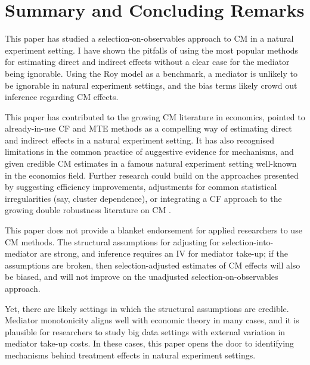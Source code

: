 \section{Summary and Concluding Remarks}
\label{sec:conclusion}

This paper has studied a selection-on-observables approach to CM in a natural experiment setting.
I have shown the pitfalls of using the most popular methods for estimating direct and indirect effects without a clear case for the mediator being ignorable.
Using the Roy model as a benchmark, a mediator is unlikely to be ignorable in natural experiment settings, and the bias terms likely crowd out inference regarding CM effects.

This paper has contributed to the growing CM literature in economics, pointed to already-in-use CF and MTE methods as a compelling way of estimating direct and indirect effects in a natural experiment setting.
It has also recognised limitations in the common practice of auggestive evidence for mechanisms, and given credible CM estimates in a famous natural experiment setting well-known in the economics field.
Further research could build on the approaches presented by suggesting efficiency improvements, adjustments for common statistical irregularities (say, cluster dependence), or integrating a CF approach to the growing double robustness literature on CM \citep{farbmacher2022causal,bia2024double}.

This paper does not provide a blanket endorsement for applied researchers to use CM methods.
The structural assumptions for adjusting for selection-into-mediator are strong, and inference requires an IV for mediator take-up; if the assumptions are broken, then selection-adjusted estimates of CM effects will also be biased, and will not improve on the unadjusted selection-on-observables approach.

Yet, there are likely settings in which the structural assumptions are credible.
Mediator monotonicity aligns well with economic theory in many cases, and it is plausible for researchers to study big data settings with external variation in mediator take-up costs.
In these cases, this paper opens the door to identifying mechanisms behind treatment effects in natural experiment settings.
